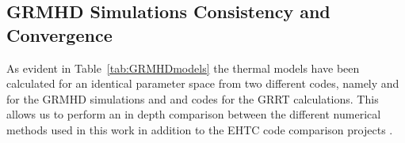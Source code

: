 

\subsection{GRMHD Simulations Consistency and Convergence}\label{app:resolution_study}

As evident in Table~\ref{tab:GRMHDmodels} the thermal models have been calculated for an identical parameter space from two different codes, namely \kharma and \bhac for the GRMHD simulations and \ipole and \bhoss codes for the GRRT calculations.
This allows us to perform an in depth comparison between the different numerical methods used in this work in addition to the EHTC code comparison projects \citep{2019ApJS..243...26P,2020ApJ...897..148G}.

